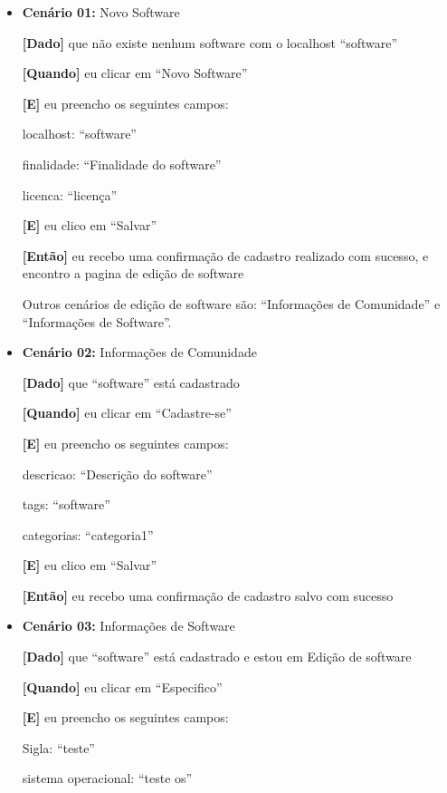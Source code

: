 \begin{itemize}
\item\textbf{Cenário 01:} Novo Software

    \textbf{[Dado]} que não existe nenhum software com o localhost ``software''

    \textbf{[Quando]} eu clicar em ``Novo Software''

    \textbf{[E]} eu preencho os seguintes campos: 

        \subitem localhost: ``software''

        \subitem finalidade: ``Finalidade do software''

        \subitem licenca: ``licença''
        
        
    \textbf{[E]} eu clico em ``Salvar''

    \textbf{[Então]} eu recebo uma confirmação de cadastro realizado com sucesso, e encontro a pagina de edição de software


Outros cenários de edição de software são: ``Informações de Comunidade'' e ``Informações de Software''.

\item\textbf{Cenário 02:} Informações de Comunidade

    \textbf{[Dado]} que ``software'' está cadastrado

    \textbf{[Quando]} eu clicar em ``Cadastre-se''

    \textbf{[E]} eu preencho os seguintes campos: 

        \subitem descricao: ``Descrição do software''

        \subitem tags: ``software''

        \subitem categorias: ``categoria1''
 
    \textbf{[E]} eu clico em ``Salvar''

    \textbf{[Então]} eu recebo uma confirmação de cadastro salvo com sucesso


\item\textbf{Cenário 03:} Informações de Software

    \textbf{[Dado]} que ``software'' está cadastrado e estou em Edição de software

    \textbf{[Quando]} eu clicar em ``Especifico''

    \textbf{[E]} eu preencho os seguintes campos: 

        \subitem Sigla: ``teste''

        \subitem sistema operacional: ``teste os''


\end{itemize}
